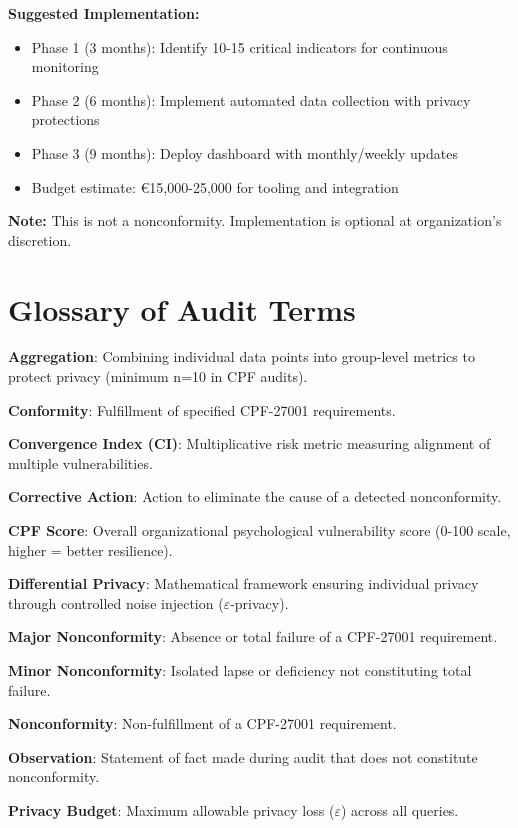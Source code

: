\documentclass[11pt,a4paper]{article}
\begin{document}
\textbf{Suggested Implementation:}

\begin{itemize}
\item Phase 1 (3 months): Identify 10-15 critical indicators for continuous monitoring
\item Phase 2 (6 months): Implement automated data collection with privacy protections
\item Phase 3 (9 months): Deploy dashboard with monthly/weekly updates
\item Budget estimate: €15,000-25,000 for tooling and integration
\end{itemize}

\textbf{Note:} This is not a nonconformity. Implementation is optional at organization's discretion.

\section{Glossary of Audit Terms}

\textbf{Aggregation}: Combining individual data points into group-level metrics to protect privacy (minimum n=10 in CPF audits).

\textbf{Conformity}: Fulfillment of specified CPF-27001 requirements.

\textbf{Convergence Index (CI)}: Multiplicative risk metric measuring alignment of multiple vulnerabilities.

\textbf{Corrective Action}: Action to eliminate the cause of a detected nonconformity.

\textbf{CPF Score}: Overall organizational psychological vulnerability score (0-100 scale, higher = better resilience).

\textbf{Differential Privacy}: Mathematical framework ensuring individual privacy through controlled noise injection ($\varepsilon$-privacy).

\textbf{Major Nonconformity}: Absence or total failure of a CPF-27001 requirement.

\textbf{Minor Nonconformity}: Isolated lapse or deficiency not constituting total failure.

\textbf{Nonconformity}: Non-fulfillment of a CPF-27001 requirement.

\textbf{Observation}: Statement of fact made during audit that does not constitute nonconformity.

\textbf{Privacy Budget}: Maximum allowable privacy loss ($\varepsilon$) across all queries.
\end{document}

